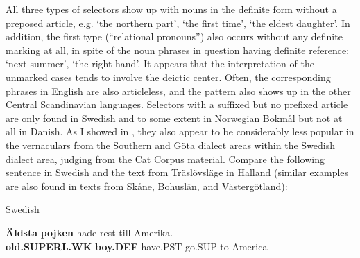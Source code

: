 
All three types of selectors show up with nouns in the definite form without a preposed article, e.g.  ‘the northern part’,  ‘the first time’,  ‘the eldest daughter’. In addition, the first type (“relational pronouns”) also occurs without any definite marking at all, in spite of the noun phrases in question having definite reference:  ‘next summer’,  ‘the right hand’. It appears that the interpretation of the unmarked cases tends to involve the deictic center. Often, the corresponding phrases in English are also articleless, and the pattern also shows up in the other Central Scandinavian languages. Selectors with a suffixed but no prefixed article are only found in Swedish and to some extent in Norwegian Bokmål but not at all in Danish. As I showed in \citet{Dahl2003}, they also appear to be considerably less popular in the vernaculars from the Southern and Göta dialect areas within the Swedish dialect area, judging from the Cat Corpus material. Compare the following sentence in Swedish and the text from Träslövsläge in Halland (similar examples are also found in texts from Skåne, Bohuslän, and Västergötland):


\item 


\item 

Swedish



 \ea\label{}
\gll \textbf{Äldsta} \textbf{pojken} hade  rest  till  Amerika.\\


\textbf{old.SUPERL.WK} \textbf{boy.DEF} have.PST  go.SUP  to  America\\


